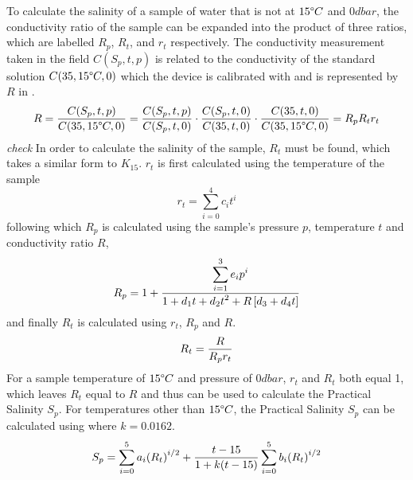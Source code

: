 To calculate the salinity of a sample of water that is not at $15\degree C$ and $0 dbar$, the conductivity ratio of the sample can be expanded into the product of three ratios, which are labelled $R_p$, $R_t$, and $r_t$ respectively.
The conductivity measurement taken in the field $C(S_p, t, p)$ is related to the conductivity of the standard solution $C(35, 15\degree C, 0)$ which the device is calibrated with and is represented by $R$ in .~\cite{ioc_teos_2010}
\begin{equation}\label{eqn:pss-78-full-ratio}
 R = \frac{\displaystyle C(S_p, t, p)}{\displaystyle C(35, 15\degree C, 0)} = \frac{\displaystyle C(S_p, t, p)}{\displaystyle C(S_p, t, 0)} \cdot \frac{\displaystyle C(S_p, t, 0)}{\displaystyle C(35, t, 0)} \cdot \frac{\displaystyle C(35, t, 0)}{\displaystyle C(35, 15\degree C, 0)} = R_p R_t r_t
\end{equation}
\textit{check}
In order to calculate the salinity of the sample, $R_t$ must be found, which takes a similar form to $K_{15}$.
$r_t$ is first calculated using the temperature of the sample 
\begin{equation}\label{eqn:pss-78-rt}
 r_t = \sum_{i=0}^{4} c_i {t}^i
\end{equation}
following which $R_p$ is calculated using the sample's pressure $p$, temperature $t$ and conductivity ratio $R$,
\begin{equation}\label{eqn:pss-78-rp}
 R_p = 1 + \frac{\displaystyle\sum_{i=1}^{3} e_i p^i}{\displaystyle1 + d_1 t + d_2 {t}^2 + R\left[ d_3 + d_4 t \right]}
\end{equation}
and finally $R_t$ is calculated using $r_t$, $R_p$ and $R$.
\begin{equation}\label{eqn:pss-78-Rt}
 R_t = \frac{\displaystyle R}{\displaystyle R_p r_t}
\end{equation}
For a sample temperature of $15\degree C$ and pressure of $0 dbar$, $r_t$ and $R_t$ both equal 1, which leaves $R_t$ equal to $R$ and thus  can be used to calculate the Practical Salinity $S_p$.
For temperatures other than $15\degree C$, the Practical Salinity $S_p$ can be calculated using  where $k = 0.0162$.~\cite{ioc_teos_2010}
\begin{equation}\label{eqn:pss-78-full}
 S_p = \sum_{i=0}^{5} a_i {(R_t)}^{i/2} + \frac{\displaystyle t-15}{\displaystyle1+k(t-15)} \sum_{i=0}^{5} b_i {(R_t)}^{i/2}
\end{equation}

